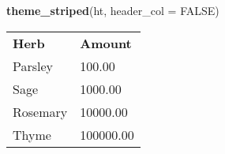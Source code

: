 \documentclass[]{article}
\newenvironment{Shaded}{\begin{snugshade}}{\end{snugshade}}
\newcommand{\KeywordTok}[1]{\textcolor[rgb]{0.13,0.29,0.53}{\textbf{{#1}}}}
\newcommand{\DataTypeTok}[1]{\textcolor[rgb]{0.13,0.29,0.53}{{#1}}}
\newcommand{\OtherTok}[1]{\textcolor[rgb]{0.56,0.35,0.01}{{#1}}}
\newcommand{\NormalTok}[1]{{#1}}
\begin{document}
\FloatBarrier

\begin{Shaded}
\begin{Highlighting}[]
\KeywordTok{theme_striped}\NormalTok{(ht, }\DataTypeTok{header_col =} \OtherTok{FALSE}\NormalTok{)}
\end{Highlighting}
\end{Shaded}

\begin{table}[h]
\begin{centering}\let\huxlen\relax
\newlength\huxlen
\begin{tabularx}{0.25\textwidth}{>{}X >{}X}
\multicolumn{1}{l}{\cellcolor[RGB]{0, 0, 0} \rule{0pt}{\baselineskip+4pt}\hspace*{4pt}\textbf{\textcolor[RGB]{255, 255, 255}{Herb}}\hspace*{4pt}\rule[-4pt]{0pt}{4pt}} & \multicolumn{1}{l}{\cellcolor[RGB]{0, 0, 0} \rule{0pt}{\baselineskip+4pt}\hspace*{4pt}\textbf{\textcolor[RGB]{255, 255, 255}{Amount}}\hspace*{4pt}\rule[-4pt]{0pt}{4pt}} \tabularnewline[-0.5pt]
\multicolumn{1}{l}{\cellcolor[RGB]{230, 230, 230} \rule{0pt}{\baselineskip+4pt}\hspace*{4pt}Parsley\hspace*{4pt}\rule[-4pt]{0pt}{4pt}} & \multicolumn{1}{l}{\cellcolor[RGB]{230, 230, 230} \rule{0pt}{\baselineskip+4pt}\hspace*{4pt}100.00\hspace*{4pt}\rule[-4pt]{0pt}{4pt}} \tabularnewline[-0.5pt]
\multicolumn{1}{l}{\cellcolor[RGB]{255, 255, 255} \rule{0pt}{\baselineskip+4pt}\hspace*{4pt}Sage\hspace*{4pt}\rule[-4pt]{0pt}{4pt}} & \multicolumn{1}{l}{\cellcolor[RGB]{255, 255, 255} \rule{0pt}{\baselineskip+4pt}\hspace*{4pt}1000.00\hspace*{4pt}\rule[-4pt]{0pt}{4pt}} \tabularnewline[-0.5pt]
\multicolumn{1}{l}{\cellcolor[RGB]{230, 230, 230} \rule{0pt}{\baselineskip+4pt}\hspace*{4pt}Rosemary\hspace*{4pt}\rule[-4pt]{0pt}{4pt}} & \multicolumn{1}{l}{\cellcolor[RGB]{230, 230, 230} \rule{0pt}{\baselineskip+4pt}\hspace*{4pt}10000.00\hspace*{4pt}\rule[-4pt]{0pt}{4pt}} \tabularnewline[-0.5pt]
\multicolumn{1}{l}{\cellcolor[RGB]{255, 255, 255} \rule{0pt}{\baselineskip+4pt}\hspace*{4pt}Thyme\hspace*{4pt}\rule[-4pt]{0pt}{4pt}} & \multicolumn{1}{l}{\cellcolor[RGB]{255, 255, 255} \rule{0pt}{\baselineskip+4pt}\hspace*{4pt}100000.00\hspace*{4pt}\rule[-4pt]{0pt}{4pt}} \tabularnewline[-0.5pt]
\end{tabularx}
\par\end{centering}
\end{table}
\end{document}
